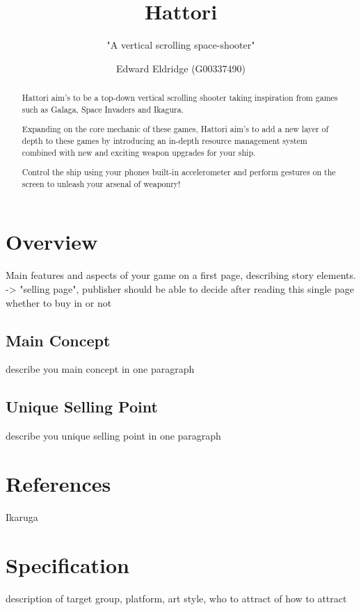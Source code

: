 \documentclass[a4paper]{scrreprt}
\title{Hattori}
\subtitle{"A vertical scrolling space-shooter"}
\author{Edward Eldridge (G00337490)}
\begin{document}
\maketitle

\begin{abstract}
Hattori aim's to be a top-down vertical scrolling shooter taking inspiration from games such as Galaga, Space Invaders and Ikagura.

Expanding on the core mechanic of these games, Hattori aim's to
add a new layer of depth to these games by introducing an in-depth resource management system combined with new and exciting weapon upgrades for your ship. 

Control the ship using your phones built-in accelerometer and perform gestures on the screen to unleash your arsenal of weaponry!


\end{abstract}

\tableofcontents

\chapter{Overview}

Main features and aspects of your game on a first page, describing story elements. -> "selling page", publisher should be able to decide after reading this single page whether to buy in or not 

\section{Main Concept}
describe you main concept in one paragraph

\section{Unique Selling Point}
describe you unique selling point in one paragraph



\chapter{References} 
Ikaruga


\chapter{Specification}
description of target group, platform, art style, who to attract of how to attract 
\end{document}
